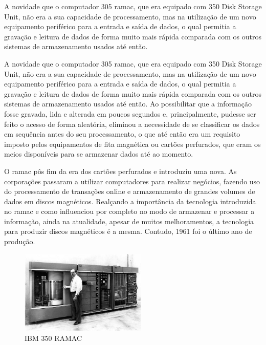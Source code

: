 \documentclass{report}
\begin{document}
		A novidade que o computador 305 \ac{ramac}, que era equipado com 350 Disk Storage Unit, não era a sua capacidade de processamento, mas na utilização de um novo equipamento periférico para a entrada e saída de dados, o qual permitia a gravação e leitura de dados de forma muito mais rápida comparada com os outros sistemas de armazenamento usados até então.
\vspace{1mm}
		
		A novidade que o computador 305 \ac{ramac}, que era equipado com 350 Disk Storage Unit, não era a sua capacidade de processamento, mas na utilização de um novo equipamento periférico para a entrada e saída de dados, o qual permitia a gravação e leitura de dados de forma muito mais rápida comparada com os outros sistemas de armazenamento usados até então. Ao possibilitar que a informação fosse gravada, lida e alterada em poucos segundos e, principalmente, pudesse ser feito o acesso de forma aleatória, eliminou a necessidade de se classificar os dados em sequência antes do seu processamento, o que até então era um requisito imposto pelos equipamentos de fita magnética ou cartões perfurados, que eram os meios disponíveis para se armazenar dados até ao momento.
\vspace{1mm}

		 O \ac{ramac} pôs fim da era dos cartões perfurados e introduziu uma nova. As corporações passaram a utilizar computadores para realizar negócios, fazendo uso do processamento de transações online e armazenamento de grandes volumes de dados em discos magnéticos. Realçando a importância da tecnologia introduzida no \ac{ramac} e como influenciou por completo no modo de armazenar e processar a informação, ainda na atualidade, apesar de muitos melhoramentos, a tecnologia para produzir discos magnéticos é a mesma. Contudo, 1961 foi o último ano de produção.

	\begin{figure} [h]
		\centering
		\includegraphics[width=6cm, height=4cm]	{RAMAC.jpg}
		\caption{IBM 350 RAMAC}
	\end{figure}
	
\newpage
		
\end{document}

